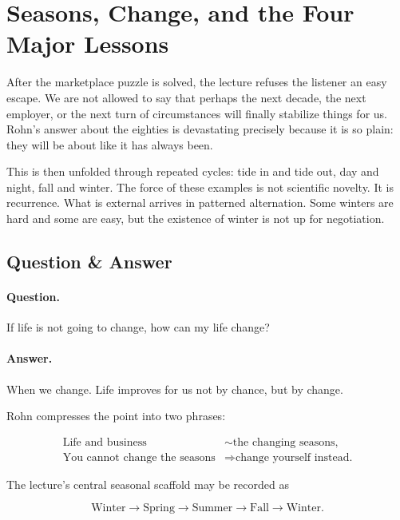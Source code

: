 \section{Seasons, Change, and the Four Major Lessons}

After the marketplace puzzle is solved, the lecture refuses the listener an easy escape. We are not allowed to say that perhaps the next decade, the next employer, or the next turn of circumstances will finally stabilize things for us. Rohn's answer about the eighties is devastating precisely because it is so plain: they will be about like it has always been.

This is then unfolded through repeated cycles: tide in and tide out, day and night, fall and winter. The force of these examples is not scientific novelty. It is recurrence. What is external arrives in patterned alternation. Some winters are hard and some are easy, but the existence of winter is not up for negotiation.

\subsection{Question \& Answer}

\paragraph{Question.} If life is not going to change, how can my life change?

\paragraph{Answer.} When we change. Life improves for us not by chance, but by change.

Rohn compresses the point into two phrases:

\begin{align}
\text{Life and business} &\sim \text{the changing seasons},\\
\text{You cannot change the seasons} &\Longrightarrow \text{change yourself instead.}
\end{align}

The lecture's central seasonal scaffold may be recorded as

\begin{equation}
\text{Winter} \to \text{Spring} \to \text{Summer} \to \text{Fall} \to \text{Winter}.
\end{equation}

